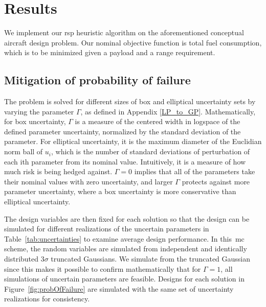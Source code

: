 \section{Results}

We implement our \gls{rsp} heuristic algorithm on the aforementioned conceptual aircraft design problem.
Our nominal objective function is total fuel consumption, which is
to be minimized given a payload and a range requirement.

\subsection{Mitigation of probability of failure}

The problem is solved for different sizes of box and elliptical uncertainty sets
by varying the parameter $\Gamma$, as defined in Appendix \ref{LP_to_GP}. Mathematically, for box uncertainty,
$\Gamma$ is a measure of the centered width in logspace of the defined parameter uncertainty, normalized by the
standard deviation of the parameter. For elliptical uncertainty, it is the maximum diameter of the Euclidian norm
ball of $u_i$, which is the number of standard deviations of perturbation of each ith parameter from its nominal value.
Intuitively, it is a measure of how much risk is being hedged against. $\Gamma = 0$
implies that all of the parameters take their nominal values with zero uncertainty,
and larger $\Gamma$ protects against more parameter uncertainty, where a box uncertainty is
more conservative than elliptical uncertainty.

The design variables are then fixed for each solution so that the design can be simulated for
different realizations of the uncertain parameters in Table~\ref{tab:uncertainties}
to examine average design performance. In this~\gls{mc} scheme, the random variables
are simulated from independent and identically distributed $3\sigma$ truncated Gaussians.
We simulate from the truncated Gaussian since this makes it possible to
confirm mathematically that for $\Gamma = 1$, all simulations of uncertain parameters are feasible.
Designs for each solution in Figure~\ref{fig:probOfFailure} are simulated with the same set
of uncertainty realizations for consistency. \\

